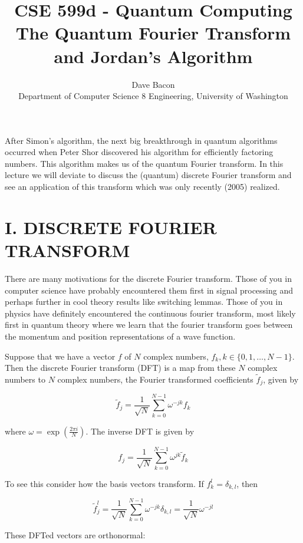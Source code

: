 \documentclass[10pt]{article}
\title{CSE 599d - Quantum Computing The Quantum Fourier Transform and Jordan's Algorithm }
\author{Dave Bacon\\
Department of Computer Science 8 Engineering, University of Washington}
\date{}
\begin{document}
\maketitle
After Simon's algorithm, the next big breakthrough in quantum algorithms occurred when Peter Shor discovered his algorithm for efficiently factoring numbers. This algorithm makes us of the quantum Fourier transform. In this lecture we will deviate to discuss the (quantum) discrete Fourier transform and see an application of this transform which was only recently (2005) realized.

\section*{I. DISCRETE FOURIER TRANSFORM}
There are many motivations for the discrete Fourier transform. Those of you in computer science have probably encountered them first in signal processing and perhaps further in cool theory results like switching lemmas. Those of you in physics have definitely encountered the continuous fourier transform, most likely first in quantum theory where we learn that the fourier transform goes between the momentum and position representations of a wave function.

Suppose that we have a vector $f$ of $N$ complex numbers, $f_{k}, k \in\{0,1, \ldots, N-1\}$. Then the discrete Fourier transform (DFT) is a map from these $N$ complex numbers to $N$ complex numbers, the Fourier transformed coefficients $\tilde{f}_{j}$, given by


\begin{equation*}
\tilde{f}_{j}=\frac{1}{\sqrt{N}} \sum_{k=0}^{N-1} \omega^{-j k} f_{k} \tag{1}
\end{equation*}


where $\omega=\exp \left(\frac{2 \pi i}{N}\right)$. The inverse DFT is given by


\begin{equation*}
f_{j}=\frac{1}{\sqrt{N}} \sum_{k=0}^{N-1} \omega^{j k} \tilde{f}_{k} \tag{2}
\end{equation*}


To see this consider how the basis vectors transform. If $f_{k}^{l}=\delta_{k, l}$, then


\begin{equation*}
\tilde{f}_{j}^{l}=\frac{1}{\sqrt{N}} \sum_{k=0}^{N-1} \omega^{-j k} \delta_{k, l}=\frac{1}{\sqrt{N}} \omega^{-j l} \tag{3}
\end{equation*}


These DFTed vectors are orthonormal:
\end{document}
